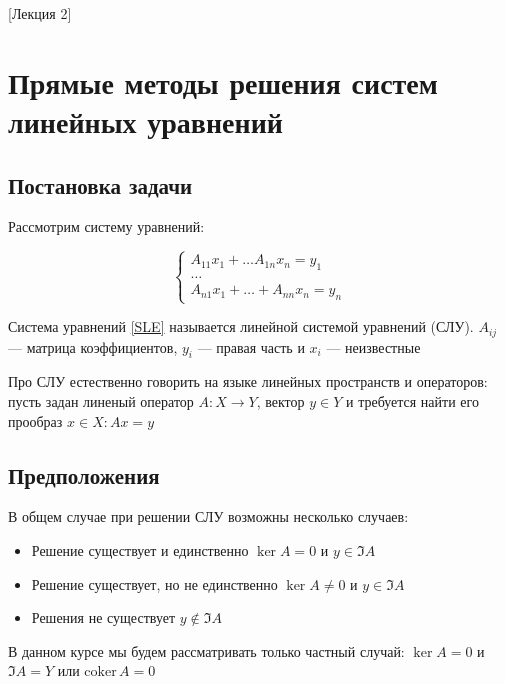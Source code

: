 [Лекция 2]

\newpage

\section{Прямые методы решения систем линейных уравнений}

\subsection*{Постановка задачи}

Рассмотрим систему уравнений:

\begin{equation}\label{SLE}
    \begin{cases}
        A_{11}x_1 + \ldots A_{1n}x_n = y_1\\
        \ldots\\
        A_{n1}x_1 + \ldots + A_{nn}x_n = y_n
    \end{cases}
\end{equation}

Система уравнений \eqref{SLE} называется линейной системой уравнений (СЛУ). $A_{ij}$ --- матрица коэффициентов, $y_i$ --- правая часть и $x_i$ --- неизвестные

Про СЛУ естественно говорить на языке линейных пространств и операторов: пусть задан линеный оператор $A: X \longrightarrow Y$, вектор $y \in Y$ и требуется найти его прообраз $x \in X: Ax = y$

\subsection*{Предположения}

В общем случае при решении СЛУ возможны несколько случаев:

\begin{itemize}
    \item Решение существует и единственно $\ker A = 0$ и $y \in \Im A$

    \item Решение существует, но не единственно $\ker A \neq 0$ и $y \in \Im A$

    \item Решения не существует $y \notin \Im A$
\end{itemize}

В данном курсе мы будем рассматривать только частный случай: $\ker A = 0$ и $\Im A = Y$ или $\mathrm{coker} \, A = 0$

